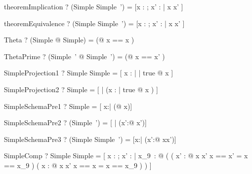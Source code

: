 \begin{theorem}{theoremImplication}
  \vdash? (Simple \implies Simple~') = [x : \arithmos; x' : \arithmos | x \in \nat \implies x' \in \nat]
\end{theorem}

\begin{theorem}{theoremEquivalence}
  \vdash? (Simple \iff Simple~') = [x : \arithmos; x' : \arithmos | x \in \nat \iff x' \in \nat]
\end{theorem}

\begin{theorem}{Theta}
  \vdash? (\mu Simple @ \theta Simple) =
          (\mu [x : \nat] @ \lblot x == x \rblot )
\end{theorem}

\begin{theorem}{ThetaPrime}
  \vdash? (\mu Simple~' @ \theta Simple~') =
          (\mu [x' : \nat] @ \lblot x == x' \rblot )
\end{theorem}

\begin{theorem}{SimpleProjection1}
  \vdash? Simple \project Simple = [ x : \nat | \exists | true @ x \in \nat ]
\end{theorem}

\begin{theorem}{SimpleProjection2}
  \vdash? Simple \project [| true] = [ | (\exists  x : \arithmos | true @ x \in \nat) ]
\end{theorem}

\begin{theorem}{SimpleSchemaPre1}
  \vdash? \pre Simple = [ x:\arithmos | (\exists @ x\in\nat)]
\end{theorem}

\begin{theorem}{SimpleSchemaPre2}
  \vdash? \pre (Simple~') = [ | (\exists x':\arithmos @ x'\in\nat)]
\end{theorem}

\begin{theorem}{SimpleSchemaPre3}
  \vdash? \pre (Simple \land Simple~') =
          [x:\arithmos | (\exists x':\arithmos @ x\in\nat \land x'\in\nat)]
\end{theorem}

\begin{theorem}{SimpleComp}
  \vdash? \Delta Simple \semi \Delta Simple =
	  [ x : \arithmos ; x' : \arithmos
		|
		  \exists x_{9}~: \arithmos @
			  ( ( \exists x' : \arithmos @
				      x \in \nat \land x' \in \nat  \land \lblot x == x' \rblot = \lblot x == x_{9} \rblot )
					\land
					( \exists x : \arithmos @
					    x \in \nat \land x' \in \nat \land \lblot x == x \rblot = \lblot x == x_{9} \rblot )  ) ]
\end{theorem}

